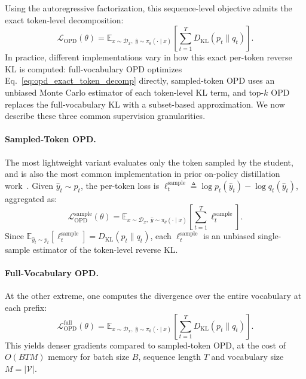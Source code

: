 Using the autoregressive factorization, this sequence-level objective admits the exact token-level decomposition:
\begin{equation}
  \mathcal{L}_{\mathrm{OPD}}(\theta)
  =
  \mathbb{E}_{x \sim \mathcal{D}_x,\;
    \hat{y} \sim \pi_\theta(\cdot \mid x)}
  \left[
    \sum_{t=1}^{T}
      D_{\mathrm{KL}}(p_t \| q_t)
  \right].
  \label{eq:opd_exact_token_decomp}
\end{equation}
In practice, different implementations vary
in how this exact per-token reverse KL is computed: full-vocabulary OPD optimizes Eq.~\eqref{eq:opd_exact_token_decomp} directly, sampled-token OPD uses an unbiased Monte Carlo estimator of each token-level KL term, and top-$k$ OPD replaces the full-vocabulary KL with a subset-based approximation.
We now describe these three common supervision granularities.




\paragraph{Sampled-Token OPD.}
The most lightweight variant evaluates only the token sampled by the student, and is also the most common implementation in prior on-policy distillation work~\citep{lu2025onpolicydistillation,xiao2026mimo,yang2026learning}. Given $\hat{y}_t \sim p_t$, the per-token loss is
$\ell_t^{\mathrm{sample}}
  \triangleq \log p_t(\hat{y}_t) - \log q_t(\hat{y}_t)$,
aggregated as:
\begin{equation}
  \mathcal{L}_{\mathrm{OPD}}^{\mathrm{sample}}(\theta)
  = \mathbb{E}_{x \sim \mathcal{D}_x,\;
      \hat{y} \sim \pi_\theta(\cdot \mid x)}
    \left[\sum_{t=1}^{T}
      \ell_t^{\mathrm{sample}}\right].
  \label{eq:opd_sampled_obj_prelim}
\end{equation}
Since
$\mathbb{E}_{\hat{y}_t \sim p_t}
  [\ell_t^{\mathrm{sample}}]
  = D_{\mathrm{KL}}(p_t \| q_t)$,
each $\ell_t^{\mathrm{sample}}$ is an unbiased single-sample
estimator of the token-level reverse KL.


\paragraph{Full-Vocabulary OPD.}
At the other extreme, one computes the divergence over the entire
vocabulary at each prefix:
\begin{equation}
  \mathcal{L}_{\mathrm{OPD}}^{\mathrm{full}}(\theta)
  = \mathbb{E}_{x \sim \mathcal{D}_x,\;
      \hat{y} \sim \pi_\theta(\cdot \mid x)}
    \left[\sum_{t=1}^{T}
      D_{\mathrm{KL}}(p_t \| q_t)\right].
  \label{eq:opd_full_obj_prelim}
\end{equation}
This yields denser gradients compared to sampled-token OPD, at the cost of $O(BTM)$ memory for batch size $B$, sequence length $T$ and vocabulary size $M = |\mathcal{V}|$.


